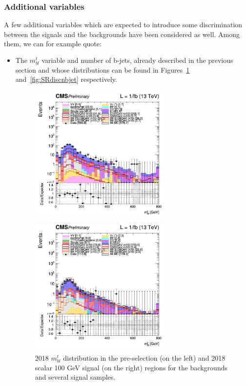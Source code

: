 \documentclass[a4paper, 10pt, openright]{report}
\begin{document}
\subsubsection*{Additional variables}

A few additional variables which are expected to introduce some discrimination between the signals and the backgrounds have been considered as well. Among them, we can for example quote:
\begin{itemize}
\item The $m_{bl}^t$ variable and number of b-jets, already described in the previous section and whose distributions can be found in Figures~\ref{fig:SRdiscmblt} and~\ref{fig:SRdiscnbjet} respectively.

\begin{figure}[htbp]
\centering
\begin{minipage}[b]{.48\textwidth}
\includegraphics[width=7cm, height=7cm]{figs/2018/log_cratio_topCR_ll_mblt.png}
\end{minipage}\hfill
\begin{minipage}[b]{.48\textwidth}
\includegraphics[width=7cm, height=7cm]{figs/2018/log_cratio_topCR_ll_DNN_signal0_scalar100_mblt.png}
\end{minipage} \hfill
\caption{2018 $m_{bl}^t$ distribution in the pre-selection (on the left) and 2018 scalar 100 GeV signal (on the right) regions for the backgrounds and several signal samples.}
\label{fig:SRdiscmblt}
\end{figure}


\end{itemize}
\end{document}
